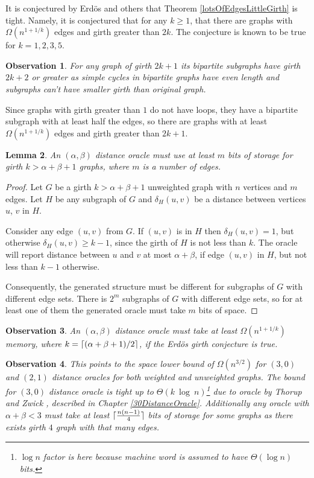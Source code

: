 \documentclass[shortabstract, lic, english]{iithesis}
\theoremstyle{definition} \newtheorem{definition}{Definition}[chapter]
\theoremstyle{plain} \newtheorem{remark}[definition]{Observation}
\theoremstyle{plain} \newtheorem{theorem}[definition]{Theorem}
\theoremstyle{plain} \newtheorem{lemma}[definition]{Lemma}
\theoremstyle{plain} \newtheorem{conjecture}[definition]{Conjecture}
\DeclarePairedDelimiter{\ceil}{\lceil}{\rceil}
\begin{document}
It is conjectured by Erd{\"o}s \cite{erdos1963} and others that Theorem \ref{lotsOfEdgesLittleGirth} is tight.
Namely, it is conjectured that for any $k\geq1$, that there are graphs with
$\Omega(n^{1 + 1/k})$ edges and girth greater than $2k$. The conjecture is known to be true for $k=1,2,3,5$.

\begin{remark}
    For any graph of girth $2k+1$ its bipartite subgraphs have girth $2k+2$ or greater
    as simple cycles in bipartite graphs have even length and subgraphs can't have smaller girth than original graph.
\end{remark}

Since graphs with girth greater than $1$ do not have loops, they have a bipartite subgraph with at least half the edges, so
there are graphs with at least $\Omega(n^{1 + 1/k})$ edges and girth greater than $2k+1$.

\begin{lemma}
    An $(\alpha, \beta)$ distance oracle 
    must use at least $m$ bits of storage for girth $k > \alpha + \beta + 1$ graphs, where $m$ is a number of edges.
\end{lemma}
\begin{proof}
    Let $G$ be a girth $k > \alpha + \beta + 1$ unweighted graph with $n$ vertices and $m$ edges.
    Let $H$ be any subgraph of $G$ and $\delta_H(u,v)$ be a distance between vertices $u$, $v$ in $H$.
    
    Consider any edge $(u, v)$ from $G$.
    If $(u, v)$ is in $H$ then $\delta_H(u,v) = 1$, but otherwise $\delta_H(u,v) \geq k - 1$, since the girth of $H$ is not less than $k$.
    The oracle will report distance between $u$ and $v$ at most $\alpha + \beta$, if edge $(u,v)$ in $H$,
    but not less than $k-1$ otherwise. 
    
    Consequently, the generated structure must be different for subgraphs of $G$ with different edge sets.
    There is $2^m$ subgraphs of $G$ with different edge sets, so for at least one of them the generated oracle must take $m$ bits of space.
\end{proof}

\begin{remark}
    An $(\alpha, \beta)$ distance oracle must take at least $\Omega(n^{1+1/k})$ memory, where
    $k=\ceil{(\alpha + \beta + 1)/2}$, if the Erd{\"o}s girth conjecture is true.
\end{remark}

\begin{remark}
    This points to the space lower bound of $\Omega(n^{3/2})$ for $(3,0)$ and $(2,1)$ distance oracles for both weighted and unweighted graphs.
    The bound for $(3, 0)$ distance oracle is tight up to $\Theta(k~\log~n)$\footnote{$\log n$ factor is here because machine word is assumed to have $\Theta(\log n)$ bits.}
    due to oracle by Thorup and Zwick \cite{a0OraclesBasic}, described in Chapter \ref{30DistanceOracle}.
    Additionally any oracle with $\alpha + \beta < 3$ must take at least $\ceil{\frac{n(n-1)}{4}}$ bits of storage for some graphs as there exists girth $4$ graph with that many edges.
\end{remark}
\end{document}
